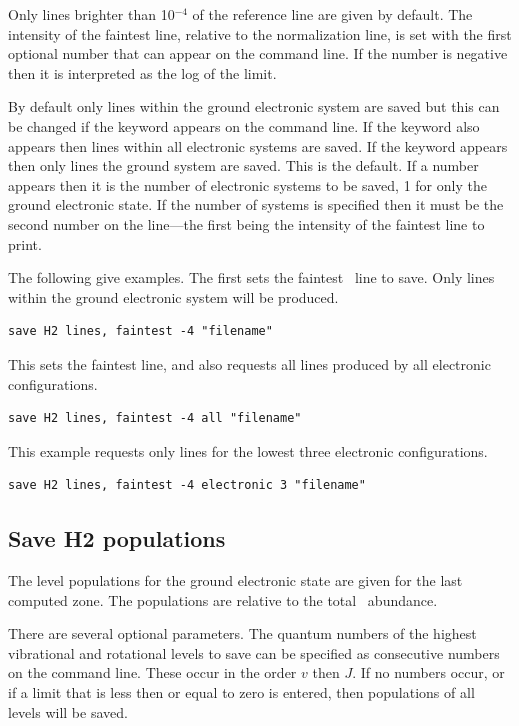 Only lines brighter than 10$^{-4}$ of the reference line are given by default.
The intensity of the faintest line, relative to the normalization line,
is set with the first optional number that can appear on the command line.
If the number is negative then it is interpreted as the log of the limit.

By default only lines within the ground electronic system are saved
but this can be changed if the keyword 
appears on the command line.
If the keyword  also appears then lines
within all electronic systems are saved.
If the keyword  appears then only lines the
ground system are saved.  This is the default.  If a number appears then
it is the number of electronic systems to be saved, 1 for only the ground
electronic state.  If the number of systems is specified then it must be
the second number on the line---the first being
the intensity of the faintest line to print.

The following give examples.  The first sets the faintest \htwo\ line to
save.  Only lines within the ground electronic system will be produced.
\begin{verbatim}
save H2 lines, faintest -4 "filename"
\end{verbatim}
This sets the faintest line, and also requests all lines produced by all
electronic configurations.
\begin{verbatim}
save H2 lines, faintest -4 all "filename"
\end{verbatim}
This example requests only lines for the lowest three electronic
configurations.
\begin{verbatim}
save H2 lines, faintest -4 electronic 3 "filename"
\end{verbatim}

\subsection{Save H2 populations}

The level populations for the ground electronic state are given for the
last computed zone.  The populations are relative to the total \htwo\ abundance.

There are several optional parameters.
The quantum numbers of the highest
vibrational and rotational levels to save can be specified as consecutive
numbers on the command line.
These occur in the order $v$ then $J$.
If no
numbers occur, or if a limit that is less then or equal to zero is entered,
then populations of all levels will be saved.

